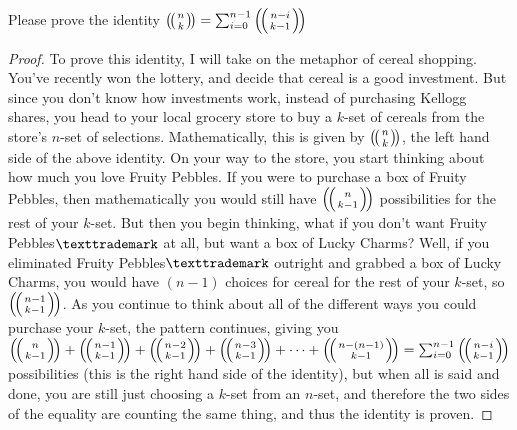 \documentclass[12pt]{article}
\newenvironment{problem}[2][Problem]{\begin{trivlist}
\item[\hskip \labelsep {\bfseries #1}\hskip \labelsep {\bfseries #2.}]}{\end{trivlist}}
\begin{document}
\begin{problem}{3}
Please prove the identity $\left(\!\left(n \atop k \right)\!\right) = \sum_{i=0}^{n-1} \left(\!\left(n-i \atop k-1 \right)\!\right)$
\end{problem}

\begin{proof}
To prove this identity, I will take on the metaphor of cereal shopping. You've recently won the lottery, and decide that cereal is a good investment. But since you don't know how investments work, instead of purchasing Kellogg shares, you head to your local grocery store to buy a $k$-set of cereals from the store's $n$-set of selections. Mathematically, this is given by $\left(\!\left(n \atop k \right)\!\right)$, the left hand side of the above identity. On your way to the store, you start thinking about how much you love Fruity Pebbles\texttrademark. If you were to purchase a box of Fruity Pebbles\texttrademark, then mathematically you would still have $\left(\!\left(n \atop k - 1 \right)\!\right)$ possibilities for the rest of your $k$-set. But then you begin thinking, what if you don't want Fruity Pebbles$\texttrademark$ at all, but want a box of Lucky Charms\texttrademark? Well, if you eliminated Fruity Pebbles$\texttrademark$ outright and grabbed a box of Lucky Charms\texttrademark, you would have $(n-1)$ choices for cereal for the rest of your $k$-set, so $\left(\!\left(n-1 \atop k - 1 \right)\!\right)$. As you continue to think about all of the different ways you could purchase your $k$-set, the pattern continues, giving you $\left(\!\left(n \atop k - 1 \right)\!\right) + \left(\!\left(n-1 \atop k - 1 \right)\!\right) + \left(\!\left(n-2 \atop k - 1 \right)\!\right) + \left(\!\left(n-3 \atop k - 1 \right)\!\right)+\cdots+\left(\!\left(n-(n-1) \atop k - 1 \right)\!\right) = \sum_{i=0}^{n-1} \left(\!\left(n-i \atop k-1 \right)\!\right)$ possibilities (this is the right hand side of the identity), but when all is said and done, you are still just choosing a $k$-set from an $n$-set, and therefore the two sides of the equality are counting the same thing, and thus the identity is proven.
\end{proof}
\end{document}
